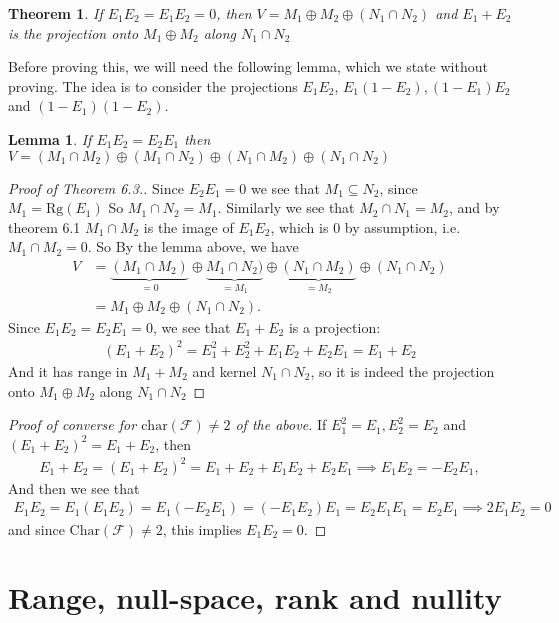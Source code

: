 \documentclass[10pt,twoside,openany,final]{memoir}
\theoremstyle{break}
\newtheorem{theorem}[section]{Theorem}
\newtheorem{lemma}[section]{Lemma}
\theoremstyle{Break}
\newcommand{\F}{\mathcal{F}}
\begin{document}
\begin{theorem}
	If $E_1E_2=E_1E_2=0$, then $V=M_1 \oplus M_2 \oplus (N_1 \cap N_2)$ and $E_1 + E_2$ is the projection onto $M_1 \oplus M_2$ along $N_1 \cap N_2$
\end{theorem}
Before proving this, we will need the following lemma, which we state without proving. The idea is to consider the projections $E_1E_2$, $E_1(1-E_2), (1-E_1)E_2$ and $(1-E_1)(1-E_2)$.
\begin{lemma}
	If $E_1E_2=E_2E_1$ then $V=(M_1 \cap M_2) \oplus (M_1 \cap N_2) \oplus (N_1 \cap M_2) \oplus (N_1 \cap N_2)$
\end{lemma}
\begin{proof}[Proof of Theorem 6.3.]
	Since $E_2E_1=0$ we see that $M_1 \subseteq N_2$, since $M_1=\textrm{Rg}(E_1)$ So $M_1 \cap N_2 = M_1$. Similarly we see that $M_2 \cap N_1 = M_2$, and by theorem 6.1 $M_1 \cap M_2$ is the image of $E_1E_2$, which is $0$ by assumption, i.e. $M_1\cap M_2 = 0$. So By the lemma above, we have
	\begin{align*}
	V&=\underbrace{(M_1\cap M_2)}_{=0} \oplus \underbrace{M_1 \cap N_2)}_{=M_1} \oplus \underbrace{(N_1 \cap M_2)}_{=M_2} \oplus (N_1 \cap N_2)\\
	&= M_1 \oplus M_2 \oplus (N_1 \cap N_2).
	\end{align*}
	Since $E_1E_2=E_2E_1=0$, we see that $E_1+E_2$ is a projection:
	\begin{align*}
		(E_1+E_2)^2=E_1^2+E_2^2+E_1E_2+E_2E_1=E_1+E_2
	\end{align*}
	And it has range in $M_1+M_2$ and kernel $N_1 \cap N_2$, so it is indeed the projection onto $M_1 \oplus M_2$ along $N_1 \cap N_2$
\end{proof}

\begin{proof}[Proof of converse for $\textrm{char}(\F)\neq 2$ of the above]
If $E_1^2=E_1, E_2^2=E_2$ and $(E_1+E_2)^2=E_1+E_2$, then 
\begin{align*}
	E_1+E_2=(E_1+E_2)^2=E_1+E_2+E_1E_2+E_2E_1 \implies E_1E_2=-E_2E_1,
\end{align*}
And then we see that
\begin{align*}
	E_1E_2=E_1(E_1E_2)=E_1(-E_2E_1)=(-E_1E_2)E_1=E_2E_1E_1=E_2E_1 \implies 2E_1E_2=0
\end{align*}
and since $\textrm{Char}(\F)\neq 2$, this implies $E_1E_2=0$.
\end{proof}

\chapter{Range, null-space, rank and nullity}
\end{document}
